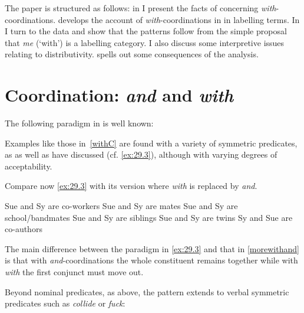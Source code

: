 \documentclass[output=paper]{langsci/langscibook}
\begin{document}
The paper is structured as follows: in  I present the
facts of  concerning \emph{with}-coordinations. 
develops the account of \emph{with}-coordinations in  in labelling
terms. In  I turn to the  data and show that the
patterns follow from the simple proposal that  \emph{me} (`with') is a
labelling category. I also discuss some interpretive issues relating to
distributivity.  spells out some consequences of the
analysis.

\section{Coordination: \emph{and} and \emph{with}}\label{secdata}

The following paradigm in  is well known:

\ea\label{andC}
    \label{andCa}
    \label{andCb}
    \z
\ex\label{withC}
    \label{withCa}
    \label{withCb}
    \z
\z

Examples like those in~\eqref{withC} are found with a variety of symmetric
predicates, as \citet{lakoff-peters:69} as well as \citet{dong:70} have
discussed (cf. \ref{ex:29.3}), although with varying degrees of
acceptability.

\ea\label{ex:29.3}
    \z
\z

Compare now \eqref{ex:29.3} with its version where \emph{with} is replaced by
\emph{and}.

\ea\label{morewithand}
    \ea Sue and Sy are co-workers
    \ex Sue and Sy are mates
    \ex Sue and Sy are school/bandmates
    \ex Sue and Sy are siblings
    \ex Sue and Sy are twins
    \ex Sy and Sue are co-authors
    \z
\z

The main difference between the paradigm in \eqref{ex:29.3} and that in
\eqref{morewithand} is that with \emph{and}-coordinations the whole constituent
remains together while with \emph{with} the first conjunct must move out.

Beyond nominal predicates, as above, the pattern extends to verbal symmetric
predicates such as \emph{collide} or \emph{fuck}:
\end{document}
